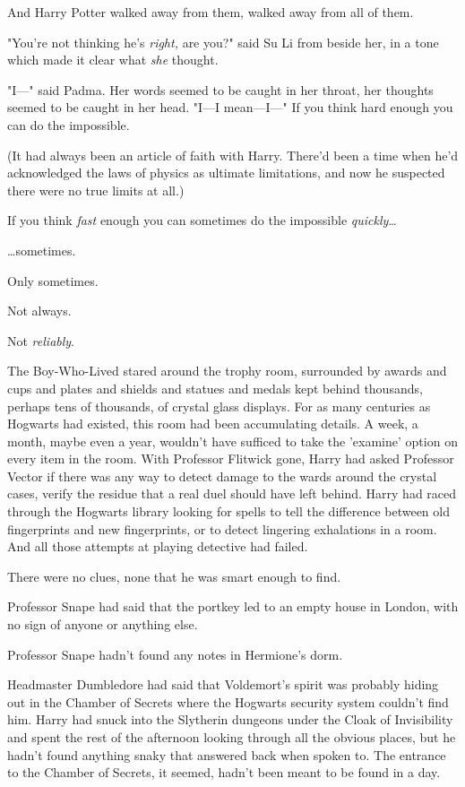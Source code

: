 And Harry Potter walked away from them, walked away from all of them.

"You're not thinking he's \emph{right,} are you?" said Su Li from beside her, 
in a tone which made it clear what \emph{she} thought.

"I---" said Padma. Her words seemed to be caught in her throat, her thoughts 
seemed to be caught in her head. "I---I mean---I---"
\sbreak
If you think hard enough you can do the impossible.

(It had always been an article of faith with Harry. There'd been a time when 
he'd acknowledged the laws of physics as ultimate limitations, and now he 
suspected there were no true limits at all.)

If you think \emph{fast} enough you can sometimes do the impossible 
\emph{quickly}{\ldots}

{\ldots}sometimes.

Only sometimes.

Not always.

Not \emph{reliably}.

The Boy-Who-Lived stared around the trophy room, surrounded by awards and cups 
and plates and shields and statues and medals kept behind thousands, perhaps 
tens of thousands, of crystal glass displays. For as many centuries as Hogwarts 
had existed, this room had been accumulating details. A week, a month, maybe 
even a year, wouldn't have sufficed to take the 'examine' option on every item 
in the room. With Professor Flitwick gone, Harry had asked Professor Vector if 
there was any way to detect damage to the wards around the crystal cases, 
verify the residue that a real duel should have left behind. Harry had raced 
through the Hogwarts library looking for spells to tell the difference between 
old fingerprints and new fingerprints, or to detect lingering exhalations in a 
room. And all those attempts at playing detective had failed.

There were no clues, none that he was smart enough to find.

Professor Snape had said that the portkey led to an empty house in London, with 
no sign of anyone or anything else.

Professor Snape hadn't found any notes in Hermione's dorm.

Headmaster Dumbledore had said that Voldemort's spirit was probably hiding out 
in the Chamber of Secrets where the Hogwarts security system couldn't find him. 
Harry had snuck into the Slytherin dungeons under the Cloak of Invisibility and 
spent the rest of the afternoon looking through all the obvious places, but he 
hadn't found anything snaky that answered back when spoken to. The entrance to 
the Chamber of Secrets, it seemed, hadn't been meant to be found in a day.


